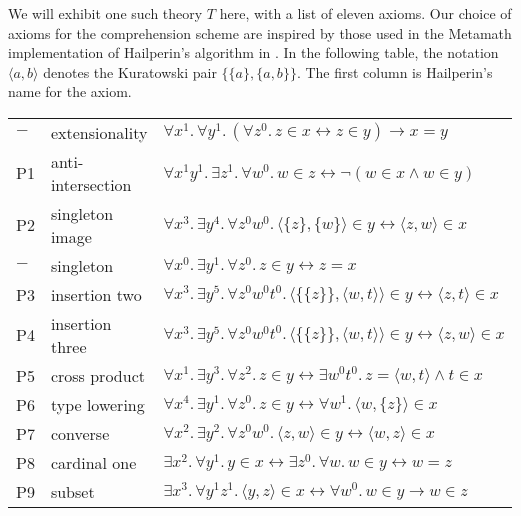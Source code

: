We will exhibit one such theory \( T \) here, with a list of eleven axioms.
Our choice of axioms for the comprehension scheme are inspired by those used in the Metamath implementation of Hailperin's algorithm in \cite{metamath-nf}.
In the following table, the notation \( \langle a, b \rangle \) denotes the Kuratowski pair \( \{ \{ a \}, \{ a, b \} \} \).
The first column is Hailperin's name for the axiom.
\begin{center}
    \begin{tabular}{lll}
        \( - \) & extensionality & \( \forall x^1.\, \forall y^1.\, (\forall z^0.\, z \in x \leftrightarrow z \in y) \to x = y \) \\
        P1 & anti-intersection & \( \forall x^1 y^1.\, \exists z^1.\, \forall w^0.\, w \in z \leftrightarrow \neg(w \in x \wedge w \in y) \) \\
        P2 & singleton image & \( \forall x^3.\, \exists y^4.\, \forall z^0 w^0.\, \langle \{ z \}, \{ w \} \rangle \in y \leftrightarrow \langle z, w \rangle \in x \) \\
        \( - \) & singleton & \( \forall x^0.\, \exists y^1.\, \forall z^0.\, z \in y \leftrightarrow z = x \) \\
        P3 & insertion two & \( \forall x^3.\, \exists y^5.\, \forall z^0 w^0 t^0.\, \langle \{ \{ z \} \}, \langle w, t \rangle \rangle \in y \leftrightarrow \langle z, t \rangle \in x \) \\
        P4 & insertion three & \( \forall x^3.\, \exists y^5.\, \forall z^0 w^0 t^0.\, \langle \{ \{ z \} \}, \langle w, t \rangle \rangle \in y \leftrightarrow \langle z, w \rangle \in x \) \\
        P5 & cross product & \( \forall x^1.\, \exists y^3.\, \forall z^2.\, z \in y \leftrightarrow \exists w^0 t^0.\, z = \langle w, t \rangle \wedge t \in x \) \\
        P6 & type lowering & \( \forall x^4.\, \exists y^1.\, \forall z^0.\, z \in y \leftrightarrow \forall w^1.\, \langle w, \{ z \} \rangle \in x \) \\
        P7 & converse & \( \forall x^2.\, \exists y^2.\, \forall z^0 w^0.\, \langle z, w \rangle \in y \leftrightarrow \langle w, z \rangle \in x \) \\
        P8 & cardinal one & \( \exists x^2.\, \forall y^1.\, y \in x \leftrightarrow \exists z^0.\, \forall w.\, w \in y \leftrightarrow w = z \) \\
        P9 & subset & \( \exists x^3.\, \forall y^1 z^1.\, \langle y, z \rangle \in x \leftrightarrow \forall w^0.\, w \in y \to w \in z \)
    \end{tabular}
\end{center}
